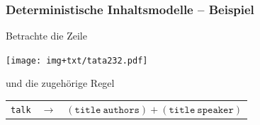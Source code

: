     \begin{frame}
      \frametitle{Deterministische Inhaltsmodelle -- Beispiel}
      
      Betrachte die Zeile
      \par\vspace*{-2pt}
      \begin{exampleblock}{}
        \texttt{[image: img+txt/tata232.pdf]}
      \end{exampleblock}
      
      \par\medskip
      und die zugehörige Regel
      \par\vspace*{-2pt}
      \begin{exampleblock}{}
        \begin{footnotesize}
          \begin{center}
            \begin{tabular}{@{}lcl@{}}
              \texttt{talk}       & $\to$ & $(\texttt{title}~\texttt{authors}) + (\texttt{title}~\texttt{speaker})$  \\
            \end{tabular}
          \end{center}
          \par
        \end{footnotesize}
      \end{exampleblock}

      \par\bigskip

    \end{frame}

